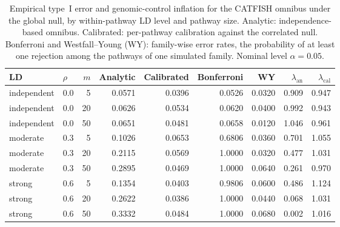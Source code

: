 \begin{table}[!htbp]
\centering
\caption{Empirical type~I error and genomic-control inflation for the CATFISH omnibus under the global null, by within-pathway LD level and pathway size. Analytic: independence-based omnibus. Calibrated: per-pathway calibration against the correlated null. Bonferroni and Westfall--Young (WY): family-wise error rates, the probability of at least one rejection among the pathways of one simulated family. Nominal level $\alpha=0.05$.}
\label{tab:null_calibration}
\small
\begin{tabular*}{\linewidth}{@{\extracolsep{\fill}}llrrrrrrr}
\hline
\textbf{LD} & $\rho$ & $m$ & \textbf{Analytic} & \textbf{Calibrated} & \textbf{Bonferroni} & \textbf{WY} & $\lambda_{\mathrm{an}}$ & $\lambda_{\mathrm{cal}}$ \\
\hline
independent & 0.0 & 5 & 0.0571 & 0.0396 & 0.0526 & 0.0320 & 0.909 & 0.947 \\
independent & 0.0 & 20 & 0.0626 & 0.0534 & 0.0620 & 0.0400 & 0.992 & 0.943 \\
independent & 0.0 & 50 & 0.0651 & 0.0481 & 0.0658 & 0.0120 & 1.046 & 0.961 \\
moderate & 0.3 & 5 & 0.1026 & 0.0653 & 0.6806 & 0.0360 & 0.701 & 1.055 \\
moderate & 0.3 & 20 & 0.2115 & 0.0569 & 1.0000 & 0.0320 & 0.477 & 1.031 \\
moderate & 0.3 & 50 & 0.2895 & 0.0469 & 1.0000 & 0.0640 & 0.261 & 0.970 \\
strong & 0.6 & 5 & 0.1354 & 0.0403 & 0.9806 & 0.0600 & 0.486 & 1.124 \\
strong & 0.6 & 20 & 0.2622 & 0.0386 & 1.0000 & 0.0440 & 0.068 & 1.031 \\
strong & 0.6 & 50 & 0.3332 & 0.0484 & 1.0000 & 0.0680 & 0.002 & 1.016 \\
\hline
\end{tabular*}
\end{table}






